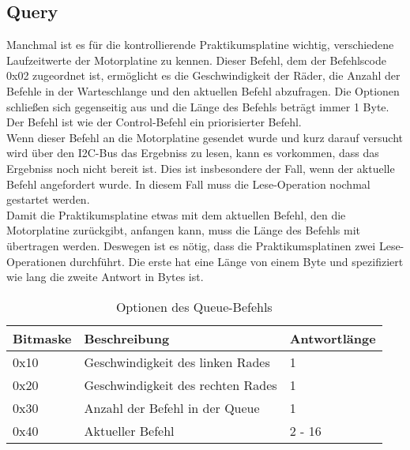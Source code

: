 \subsection{Query}
Manchmal ist es für die kontrollierende Praktikumsplatine wichtig, verschiedene Laufzeitwerte
der Motorplatine zu kennen. Dieser Befehl, dem der Befehlscode 0x02 zugeordnet ist, ermöglicht
es die Geschwindigkeit der Räder, die Anzahl der Befehle in der Warteschlange und den aktuellen
Befehl abzufragen. Die Optionen schließen sich gegenseitig aus und die Länge des Befehls beträgt
immer 1 Byte. Der Befehl ist wie der Control-Befehl ein priorisierter Befehl.\\
Wenn dieser Befehl an die Motorplatine gesendet wurde und kurz darauf versucht wird über den
I2C-Bus das Ergebniss zu lesen, kann es vorkommen, dass das Ergebniss noch nicht bereit ist.
Dies ist insbesondere der Fall, wenn der aktuelle Befehl angefordert wurde. In diesem Fall muss
die Lese-Operation nochmal gestartet werden.\\
Damit die Praktikumsplatine etwas mit dem aktuellen Befehl, den die Motorplatine zurückgibt,
anfangen kann, muss die Länge des Befehls mit übertragen werden. Deswegen ist es nötig,
dass die Praktikumsplatinen zwei Lese-Operationen durchführt. Die erste hat eine Länge
von einem Byte und spezifiziert wie lang die zweite Antwort in Bytes ist.

\begin{table}[htb]
\begin{center}
	\begin{tabularx}{\linewidth}{|l|l|X|}
		\hline
		\textbf{Bitmaske} & \textbf{Beschreibung} & \textbf{Antwortlänge} \\
		\hline
		\hline
		0x10 				& Geschwindigkeit des linken Rades & 1 \\
		\hline
		0x20				& Geschwindigkeit des rechten Rades & 1 \\
		\hline
		0x30				& Anzahl der Befehl in der Queue & 1 \\
		\hline
		0x40				& Aktueller Befehl & 2 - 16 \\
		\hline
	\end{tabularx}
	\caption{\label{protocol_queue} Optionen des Queue-Befehls}
\end{center}
\end{table}

